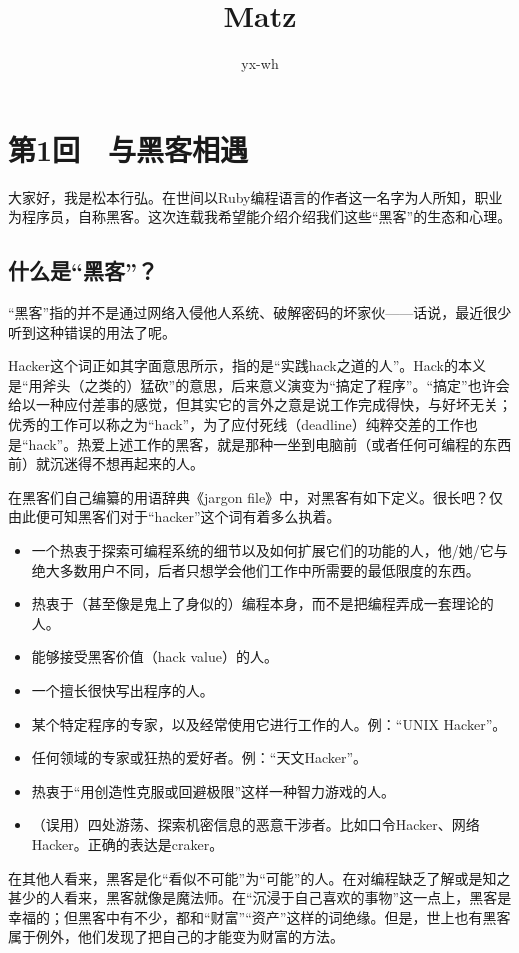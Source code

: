 \documentclass[a4paper,12pt]{article}
\author{yx-wh}
\title{Matz}
\begin{document}
\newpage
\setcounter{tocdepth}{2}
\tableofcontents
\newpage

\section{第1回　与黑客相遇}
大家好，我是松本行弘。在世间以Ruby编程语言的作者这一名字为人所知，职业为程序员，自称黑客。这次连载我希望能介绍介绍我们这些“黑客”的生态和心理。

\subsection{什么是“黑客”？}

“黑客”指的并不是通过网络入侵他人系统、破解密码的坏家伙——话说，最近很少听到这种错误的用法了呢。

Hacker这个词正如其字面意思所示，指的是“实践hack之道的人”。Hack的本义是“用斧头（之类的）猛砍”的意思，后来意义演变为“搞定了程序”。“搞定”也许会给以一种应付差事的感觉，但其实它的言外之意是说工作完成得快，与好坏无关；优秀的工作可以称之为“hack”，为了应付死线（deadline）纯粹交差的工作也是“hack”。热爱上述工作的黑客，就是那种一坐到电脑前（或者任何可编程的东西前）就沉迷得不想再起来的人。

在黑客们自己编纂的用语辞典《jargon file》中，对黑客有如下定义。很长吧？仅由此便可知黑客们对于“hacker”这个词有着多么执着。

\begin{itemize}
\item 一个热衷于探索可编程系统的细节以及如何扩展它们的功能的人，他/她/它与绝大多数用户不同，后者只想学会他们工作中所需要的最低限度的东西。
\item 热衷于（甚至像是鬼上了身似的）编程本身，而不是把编程弄成一套理论的人。
\item 能够接受黑客价值（hack value）的人。
\item 一个擅长很快写出程序的人。
\item 某个特定程序的专家，以及经常使用它进行工作的人。例：“UNIX Hacker”。
\item 任何领域的专家或狂热的爱好者。例：“天文Hacker”。
\item 热衷于“用创造性克服或回避极限”这样一种智力游戏的人。
\item （误用）四处游荡、探索机密信息的恶意干涉者。比如口令Hacker、网络Hacker。正确的表达是craker。
\end{itemize}



在其他人看来，黑客是化“看似不可能”为“可能”的人。在对编程缺乏了解或是知之甚少的人看来，黑客就像是魔法师。在“沉浸于自己喜欢的事物”这一点上，黑客是幸福的；但黑客中有不少，都和“财富”“资产”这样的词绝缘。但是，世上也有黑客属于例外，他们发现了把自己的才能变为财富的方法。
\end{document}
